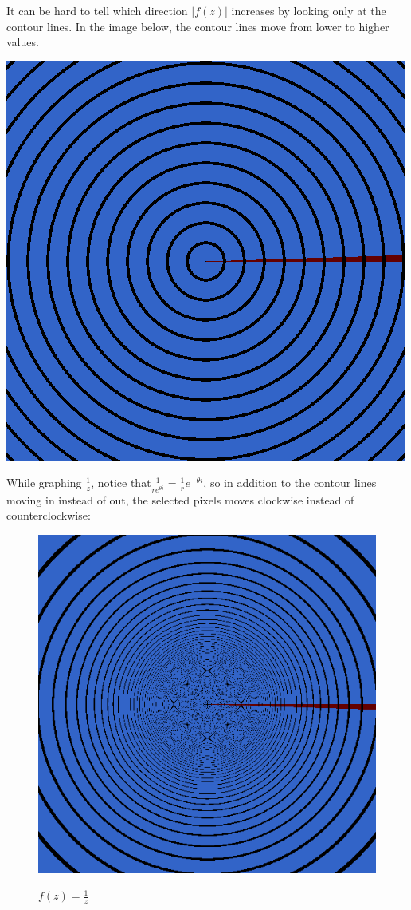 \documentclass[xhtml, mathjax]{article}
\begin{document}
    It can be hard to tell which direction $|f(z)|$ increases by looking only at
    the contour lines. In the image below, the contour lines move from lower to
    higher values.


    \begin{center}
      \includegraphics{z_contour_loop.gif}
    \end{center}

    While graphing $\frac{1}{z}$, notice that$\frac{1}{re^{\theta i}} =
    \frac{1}{r}e^{-\theta i}$, so in addition to the contour lines moving in
    instead of out, the selected pixels moves clockwise instead of
    counterclockwise:

    \begin{figure}
      \centering
      \includegraphics{inv.gif}\par
      $f(z) = \frac{1}{z}$
    \end{figure}
\end{document}
